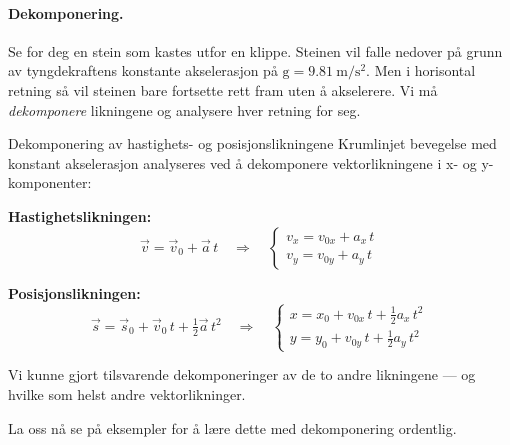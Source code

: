 \paragraph{Dekomponering.} Se for deg en stein som kastes utfor en klippe. Steinen vil falle nedover på grunn av tyngdekraftens konstante akselerasjon på $\mathrm{g}=\SI{9.81}{\metre\per\second\squared}$. Men i horisontal retning så vil steinen bare fortsette rett fram uten å akselerere. Vi må \textit{dekomponere} likningene og analysere hver retning for seg. 

\begin{myoppsum*}{Dekomponering av hastighets- og posisjonslikningene}
Krumlinjet bevegelse med konstant akselerasjon analyseres ved å dekomponere vektorlikningene i x- og y-komponenter:

\medskip
\textbf{Hastighetslikningen:}
\[
  \vec{v} = \vec{v}_0 + \vec{a}\,t
  \quad\Longrightarrow\quad
  \begin{cases}
    v_x = v_{0x} + a_x\,t \\[5pt]
    v_y = v_{0y} + a_y\,t
  \end{cases}
\]

\medskip
\textbf{Posisjonslikningen:}
\[
  \vec{s} = \vec{s}_0 + \vec{v}_0\,t + \tfrac{1}{2}\vec{a}\,t^2
  \quad\Longrightarrow\quad
  \begin{cases}
    x = x_0 + v_{0x}\,t + \tfrac{1}{2}a_x\,t^2 \\[5pt]
    y = y_0 + v_{0y}\,t + \tfrac{1}{2}a_y\,t^2
  \end{cases}
\]
\end{myoppsum*}
Vi kunne gjort tilsvarende dekomponeringer av de to andre likningene — og hvilke som helst andre vektorlikninger.

La oss nå se på eksempler for å lære dette med dekomponering ordentlig.

